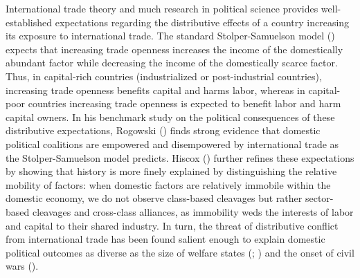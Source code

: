 \documentclass[12pt]{report}
\begin{document}
International trade theory and much research in political science
provides well-established expectations regarding the distributive
effects of a country increasing its exposure to international trade.
The standard Stolper-Samuelson model (\citeyear{Stolper:1941vp})
expects that increasing trade openness increases the income of the
domestically abundant factor while decreasing the income of the domestically
scarce factor. Thus, in capital-rich countries (industrialized or
post-industrial countries), increasing trade openness benefits capital
and harms labor, whereas in capital-poor countries increasing trade
openness is expected to benefit labor and harm capital owners. In
his benchmark study on the political consequences of these distributive
expectations, Rogowski (\citeyear{Rogowski:1989wm}) finds strong
evidence that domestic political coalitions are empowered and disempowered
by international trade as the Stolper-Samuelson model predicts. Hiscox
(\citeyear{hiscox2002international}) further refines these expectations
by showing that history is more finely explained by distinguishing
the relative mobility of factors: when domestic factors are relatively
immobile within the domestic economy, we do not observe class-based
cleavages but rather sector-based cleavages and cross-class alliances,
as immobility weds the interests of labor and capital to their shared
industry. In turn, the threat of distributive conflict from international
trade has been found salient enough to explain domestic political
outcomes as diverse as the size of welfare states (\citealt{Cameron:1978vb};
\citealt{Burgoon:2001dp}) and the onset of civil wars (\citealt{Bussmann:2007vx}).
\end{document}
